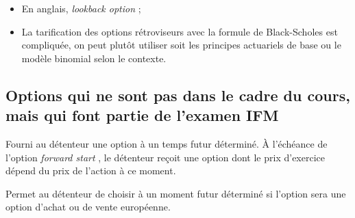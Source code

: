 \documentclass[10pt, french]{article}
\begin{document}
\begin{multicols*}{2}
\begin{definitionNOHFILL}
\tcbline

\begin{itemize}[leftmargin = *]
	\item	En anglais, \og \textit{lookback option} \fg{};
	\item	La tarification des options rétroviseurs avec la formule de Black-Scholes est compliquée, on peut plutôt utiliser soit les principes actuariels de base ou le modèle binomial selon le contexte.
\end{itemize}
\end{definitionNOHFILL}

\columnbreak
\subsection{Options qui ne sont pas dans le cadre du cours, mais qui font partie de l'examen IFM}
\begin{definitionNOHFILLsub}
Fourni au détenteur une option à un temps futur déterminé. À l'échéance de l'option \og \textit{forward start} \fg{}, le détenteur reçoit une option dont le prix d'exercice dépend du prix de l'action à ce moment.	
\end{definitionNOHFILLsub}

\begin{definitionNOHFILLsub}
Permet au détenteur de choisir à un moment futur déterminé si l'option sera une option d'achat ou de vente européenne.
\end{definitionNOHFILLsub}

\end{multicols*}

\newpage
\end{document}
